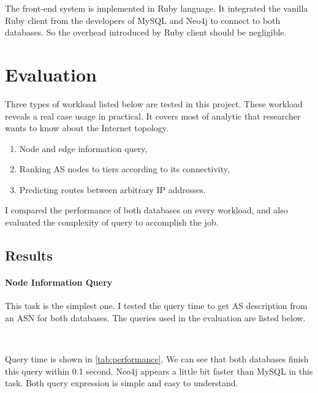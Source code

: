 \documentclass[letterpaper,twocolumn,11pt]{article}
\begin{document}
{The front-end system is implemented in Ruby language. It integrated the vanilla Ruby client from the developers of MySQL and Neo4j to connect to both databases. So the overhead introduced by Ruby client should be negligible. 

\section{Evaluation}
Three types of workload listed below are tested in this project. These workload reveals a real case usage in practical. It covers most of analytic that researcher wants to know about the Internet topology.
\begin{enumerate}
\item Node and edge information query,
\item Ranking AS nodes to tiers according to its connectivity,
\item Predicting routes between arbitrary IP addresses.
\end{enumerate}

I compared the performance of both databases on every workload, and also evaluated the complexity of query to accomplish the job.

\subsection{Results}

\paragraph{Node Information Query}

This task is the simplest one. I tested the query time to get AS description from an ASN for both databases. The queries used in the evaluation are listed below.
\begin{center}
\\
\vspace{6pt}
\end{center}

Query time is shown in \autoref{tab:performance}. We can see that both databases finish this query within 0.1 second. Neo4j appears a little bit faster than MySQL in this task. Both query expression is simple and easy to understand.

}
\end{document}
